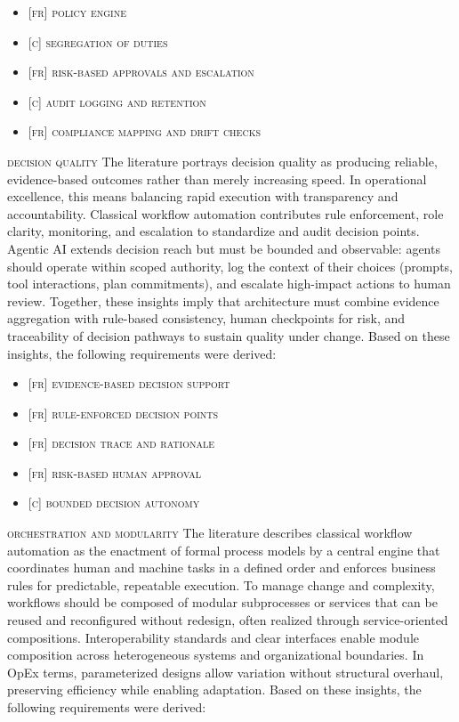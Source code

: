 \begin{itemize}
  \item \textsc{[fr] policy engine}
  \item \textsc{[c] segregation of duties}
  \item \textsc{[fr] risk-based approvals and escalation}
  \item \textsc{[c] audit logging and retention}
  \item \textsc{[fr] compliance mapping and drift checks}
\end{itemize}

\noindent \textsc{decision quality} \quad The literature portrays decision quality as producing reliable, evidence-based outcomes rather than merely increasing speed. In operational excellence, this means balancing rapid execution with transparency and accountability. Classical workflow automation contributes rule enforcement, role clarity, monitoring, and escalation to standardize and audit decision points. Agentic AI extends decision reach but must be bounded and observable: agents should operate within scoped authority, log the context of their choices (prompts, tool interactions, plan commitments), and escalate high-impact actions to human review. Together, these insights imply that architecture must combine evidence aggregation with rule-based consistency, human checkpoints for risk, and traceability of decision pathways to sustain quality under change. Based on these insights, the following requirements were derived:

\begin{itemize}
  \item \textsc{[fr] evidence-based decision support}
  \item \textsc{[fr] rule-enforced decision points}
  \item \textsc{[fr] decision trace and rationale}
  \item \textsc{[fr] risk-based human approval}
  \item \textsc{[c] bounded decision autonomy}
\end{itemize}

\noindent \textsc{orchestration and modularity} \quad The literature describes classical workflow automation as the enactment of formal process models by a central engine that coordinates human and machine tasks in a defined order and enforces business rules for predictable, repeatable execution. To manage change and complexity, workflows should be composed of modular subprocesses or services that can be reused and reconfigured without redesign, often realized through service-oriented compositions. Interoperability standards and clear interfaces enable module composition across heterogeneous systems and organizational boundaries. In OpEx terms, parameterized designs allow variation without structural overhaul, preserving efficiency while enabling adaptation. Based on these insights, the following requirements were derived:

